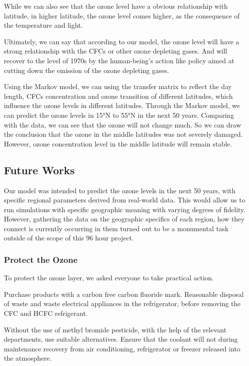 \documentclass[12pt]{article}
\begin{document}
While we can also see that the ozone level have a obvious relationship with latitude, in higher latitude, the ozone level comes higher, as the consequence of the temperature and light. 

Ultimately, we can say that according to our model, the ozone level will have a strong relationship with the CFCs or other ozone depleting  gases. And will recover to the level of 1970s by the human-being's action like policy aimed at cutting down the emission of the ozone depleting gases. 

Using the Markov model, we can using the transfer matrix to reflect the day length, CFCs concentration and ozone transition of different latitudes, which influence the ozone levels in different latitudes. Through the Markov model, we can predict the ozone levels in 15°N to 55°N in the next 50 years. Comparing with the data, we can see that the ozone will not change much. So we can draw the conclusion that the ozone in the middle latitudes was not severely damaged. However, ozone concentration level in the middle latitude will remain stable.
\subsection{Future Works}
Our model was intended to predict the ozone levels in the next 50 years, with specific regional parameters derived from real-world data. This would allow us to run simulations with specific geographic meaning with varying degrees of fidelity. However, gathering the data on the geographic specifics of each region, how they connect  is currently occurring in them turned out to be a monumental task outside of the scope of this 96 hour project.\cite{kuntasal1987trends}\cite{Holt-Winters-Forecasting}\cite{chatfield1988holt}\cite{cipra1995holt}\cite{newman2006will}\cite{shindell1998increased}\cite{sokhi2006prediction}\cite{wang2003prediction}\cite{yi1996neural}

\subsubsection{Protect the Ozone}
To protect the ozone layer, we asked everyone to take practical action. 

Purchase products with a carbon free carbon fluoride mark. Reasonable disposal of waste and waste electrical appliances in the refrigerator, before removing the CFC and HCFC refrigerant. 

Without the use of methyl bromide pesticide, with the help of the relevant departments, use suitable alternatives. Ensure that the coolant will not during maintenance recovery from air conditioning, refrigerator or freezer released into the atmosphere.
\end{document}
